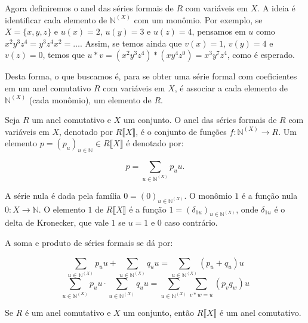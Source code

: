 Agora definiremos o anel das séries formais de $R$ com variáveis em $X$.
A ideia é identificar cada elemento de $\mathbb N^{(X)}$ com um monômio.
Por exemplo, se $X=\{x, y, z\}$ e $u(x)=2$, $u(y)=3$ e $u(z)=4$, pensamos em $u$ como $x^2y^3z^4=y^3z^4x^2=\dots$.
Assim, se temos ainda que $v(x)=1$, $v(y)=4$ e $v(z)=0$, temos que $u*v=(x^2y^3z^4)*(xy^4z^0)=x^3y^7z^4$, como é esperado.

Desta forma, o que buscamos é, para se obter uma série formal com coeficientes em um anel comutativo $R$ com variáveis em $X$, é associar a cada elemento de $\mathbb N^{(X)}$ (cada monômio), um elemento de $R$.
\begin{definition}
    Seja $R$ um anel comutativo e $X$ um conjunto. O anel das séries formais de $R$ com variáveis em $X$, denotado por $R\llbracket X\rrbracket$, é o conjunto de funções $f:\mathbb N^{(X)}\rightarrow R$. Um elemento $p=(p_u)_{u \in \mathbb N}\in R\llbracket X\rrbracket$ é denotado por:

    \[p=\sum_{u \in \mathbb N^{(X)}}p_u u.\]

    A série nula é dada pela família $0=(0)_{u \in \mathbb N^{(X)}}$.
    O monômio $1$ é a função nula $0:X\rightarrow \mathbb N$. O elemento $1$ de $R\llbracket X\rrbracket$ é a função $1=(\delta_{1u})_{u \in \mathbb N^{(X)}}$, onde $\delta_{1u}$ é o delta de Kronecker, que vale $1$ se $u=1$ e $0$ caso contrário.

    A soma e produto de séries formais se dá por:

    \[\sum_{u \in \mathbb N^{(X)}}p_u u+\sum_{u \in \mathbb N^{(X)}}q_u u=\sum_{u \in \mathbb N^{(X)}}(p_u+q_u)u\]
    \[\sum_{u \in \mathbb N^{(X)}}p_u u\cdot \sum_{u \in \mathbb N^{(X)}}q_u u=\sum_{u \in \mathbb N^{(X)}}\sum_{v*w=u}(p_vq_w)u\]
\end{definition}

\begin{lemma}
    Se $R$ é um anel comutativo e $X$ um conjunto, então $R\llbracket X \rrbracket$ é um anel comutativo.
\end{lemma}

